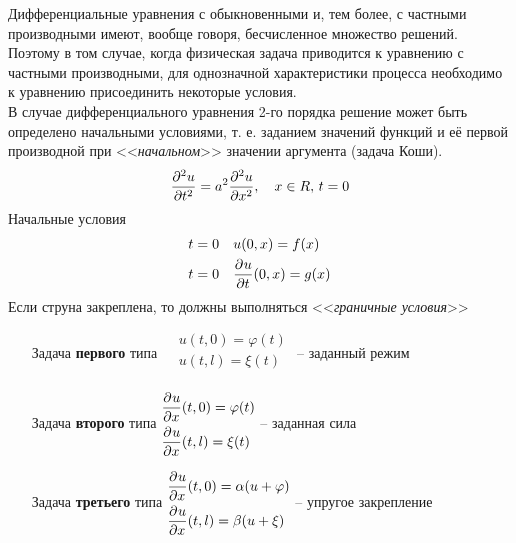 Дифференциальные уравнения с обыкновенными и, тем более, с частными производными имеют, вообще говоря, бесчисленное множество решений. Поэтому в том случае, когда физическая задача приводится к уравнению с частными производными, для однозначной характеристики процесса необходимо к уравнению присоединить некоторые условия.\\

В случае дифференциального уравнения 2-го порядка решение может быть определено начальными условиями, т. е. заданием значений функций и её первой производной при <<\textit{начальном}>> значении аргумента (задача Коши).
	\[\frac{\partial^{2}u}{\partial t^{2}} = a^2 \frac{\partial^{2}u}{\partial x^{2}}, \quad x \in R,\, t = 0\]
Начальные условия
	\begin{align*}
		&t=0 \quad u(0, x) = f(x)\\
		&t=0 \quad \frac{\partial^{}u}{\partial t^{}} (0, x) = g(x)\\
	\end{align*}
Если струна закреплена, то должны выполняться <<\textit{граничные условия}>>\\
	\begin{itemize} \setlength{\itemindent}{10pt}
		\item[Задача \textbf{первого} типа]
		$\begin{aligned}
			&u(t, 0)  = \varphi(t)\\
			&u(t, l) = \xi(t)\\
		\end{aligned}$ -- заданный режим
		\item[Задача \textbf{второго} типа]
		$\begin{aligned}
			&\frac{\partial^{}u}{\partial x^{}}(t, 0) = \varphi(t)\\
			&\frac{\partial^{}u}{\partial x^{}}(t, l) = \xi(t)\\
		\end{aligned}$ -- заданная сила
	
		\item[Задача \textbf{третьего} типа]
		$\begin{aligned}
			&\frac{\partial^{}u}{\partial x^{}}(t, 0) = \alpha(u + \varphi)\\
			&\frac{\partial^{}u}{\partial x^{}}(t, l) = \beta(u + \xi)\\
		\end{aligned}$ -- упругое закрепление
	\end{itemize}


